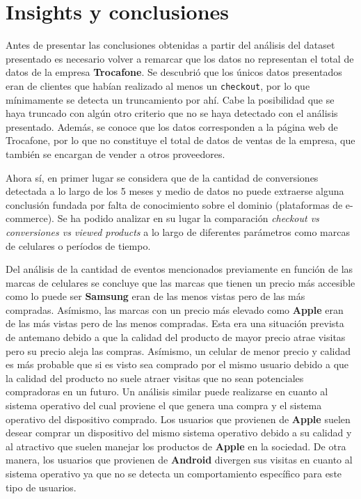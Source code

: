\documentclass[a4paper]{article}
\begin{document}
\section{Insights y conclusiones}

Antes de presentar las conclusiones obtenidas a partir del análisis del dataset presentado es necesario volver a remarcar que los datos no representan el total de datos de la empresa \textbf{Trocafone}. Se descubrió que los únicos datos presentados eran de clientes que habían realizado al menos un \texttt{checkout}, por lo que mínimamente se detecta un truncamiento por ahí. Cabe la posibilidad que se haya truncado con algún otro criterio que no se haya detectado con el análisis presentado. Además, se conoce que los datos corresponden a la página web de Trocafone, por lo que no constituye el total de datos de ventas de la empresa, que también se encargan de vender a otros proveedores.

Ahora sí, en primer lugar se considera que de la cantidad de conversiones detectada a lo largo de los 5 meses y medio de datos no puede extraerse alguna conclusión fundada por falta de conocimiento sobre el dominio (plataformas de e-commerce). Se ha podido analizar en su lugar la comparación \textit{checkout vs conversiones vs viewed products} a lo largo de diferentes parámetros como marcas de celulares o períodos de tiempo.

Del análisis de la cantidad de eventos mencionados previamente en función de las marcas de celulares se concluye que las marcas que tienen un precio más accesible como lo puede ser \textbf{Samsung} eran de las menos vistas pero de las más compradas. Asímismo, las marcas con un precio más elevado como \textbf{Apple} eran de las más vistas pero de las menos compradas. Esta era una situación prevista de antemano debido a que la calidad del producto de mayor precio atrae visitas pero su precio aleja las compras. Asímismo, un celular de menor precio y calidad es más probable que si es visto sea comprado por el mismo usuario debido a que la calidad del producto no suele atraer visitas que no sean potenciales compradoras en un futuro. Un análisis similar puede realizarse en cuanto al sistema operativo del cual proviene el que genera una compra y el sistema operativo del dispositivo comprado. Los usuarios que provienen de \textbf{Apple} suelen desear comprar un dispositivo del mismo sistema operativo debido a su calidad y al atractivo que suelen manejar los productos de \textbf{Apple} en la sociedad. De otra manera, los usuarios que provienen de \textbf{Android} divergen sus visitas en cuanto al sistema operativo ya que no se detecta un comportamiento específico para este tipo de usuarios.
\end{document}
